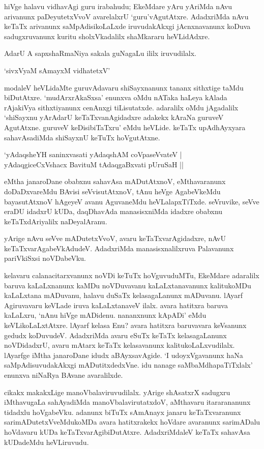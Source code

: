 hiVge halavu vidhavAgi guru irabahudu; EkeMdare yAru yAriMda nAvu arivanunx paDeyutetxVvoV avarelalxrU `guru'vAgutAtxre. AdadxriMda nAvu keTaTx arivanunx saMpAdisikoLaLxde iruvudakAkxgi jAcnxnavanunx koDuva sadugxruvanunx kuritu sholxVkadalilx shaMkararu heVLidAdxre.

AdarU A sapxshaRmaNiya sakala guNagaLu ililx iruvudilalx. 


\begin{shloka}
`sivxVyaM sAmayxM vidhatetxV'
\end{shloka}

modaleV heVLidaMte guruvAdavaru shiSayxnanunx tananx sithxtige taMdu biDutAtxre. `mudArxrAkaSxsa' enunxva oMdu nATaka haLeya kAlada rAjakiVya sithxtiyanunx cenAnxgi tiLisutatxde. adaralilx oMdu jAgadalilx `shiSayxnu yArAdarU keTaTxvanAgidadxre adakekx kAraNa guruveV AgutAtxne. guruveV keDisibiTaTxru' eMdu heVLide. keTaTx upAdhAyxyara sahavAsadiMda shiSayxnU keTuTx hoVgutAtxne.

\begin{shloka}
`yAdaqsheYH saninxvasati yAdaqshAM coVpaseVvateV |\\
yAdaqgiceCxVshacx BavituM tAdaqgaBxvati pUruSaH ||
\end{shloka}

 eMtha janaroDane obabxnu sahavAsa mADutAtxnoV, eMthavaranunx doDaDxvareMdu BAvisi seVvisutAtxnoV, tAnu heVge AgabeVkeMdu bayasutAtxnoV hAgeyeV avanu AguvaneMdu heVLalapxTiTxde. seVruvike, seVve eraDU idadxrU kUDa, daqDhavAda manasisxniMda idadxre obabxnu keTaTxdAriyalilx naDeyalAranu. 
 
 yArige nAvu seVve mADutetxVvoV, avaru keTaTxvarAgidadxre, nAvU keTaTxvarAgabeVkAdudeV. AdadxriMda manasisxnalilxruva Palavanunx pariVkiSxsi noVDabeVku.
 
kelavaru calanacitarxvanunx noVDi keTuTx hoVguvuduMTu, EkeMdare adaralilx baruva kaLaLxnanunx kaMDu noVDuvavanu kaLaLxtanavanunx kalitukoMDu kaLaLxtana mADuvanu, halavu duSaTx kelasagaLanunx mADuvanu. lAyarf Agiruvavaru keVLade iruva kaLaLxtanaveV ilalx. avara hatitxra baruva kaLaLxru, `nAnu hiVge mADidenu. nananxnunx kApADi' eMdu keVLikoLaLxtAtxre. lAyarf kelasa Enu? avara hatitxra baruvavara keVsanunx gedudx koDuvudeV. AdadxriMda avaru eSuTx keTaTx kelasagaLanunx noVDidadxrU, avaru mAtarx keTaTx kelasavanunx kalitukoLaLxvudilalx. lAyarfge iMtha janaroDane idudx aBAyxsavAgide. `I udoyxVgavanunx haNa saMpAdisuvudakAkxgi mADutitxdedxVne. idu nanage saMbaMdhapaTiTxlalx' enunxva niNaRya BAvane avaralilxde. 

cikakx makakxLige manoVbalaviruvudilalx. yArige shAsatxrX sadugxru iMthavugaLa sahAyadiMda manoVbalavirutatxdoV, aMthavaru itararananunx tidadxlu hoVgabeVku. adanunx biTuTx sAmAnayx janaru keTaTxvaranunx sarimADutetxVveMdukoMDa avara hatitxrakekx hoVdare avaranunx sarimADalu hoVdavaru kUDa keTaTxvarAgibiDutAtxre. AdadxriMdaleV keTaTx sahavAsa kUDadeMdu heVLiruvudu.


